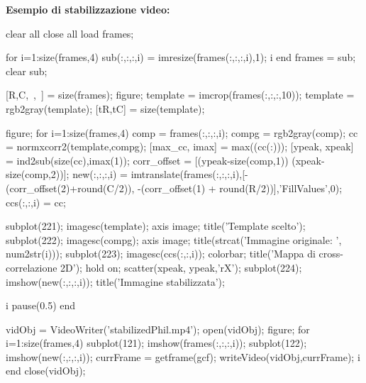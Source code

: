 \documentclass[a4paper, 10pt]{report}
\begin{document}
\noindent \textbf{Esempio di stabilizzazione video:}

\begin{code}
clear all
close all
load frames; %


for i=1:size(frames,4)        %
    sub(:,:,:,i) = imresize(frames(:,:,:,i),1);  
    i
end
frames = sub;
clear sub;

[R,C,~,~] = size(frames);  %
figure; template = imcrop(frames(:,:,:,10));
template = rgb2gray(template);  %
[tR,tC] = size(template);  %


figure;
for i=1:size(frames,4)
    comp  = frames(:,:,:,i);
    compg = rgb2gray(comp);
    cc = normxcorr2(template,compg);
    [max_cc, imax] = max((cc(:)));
    [ypeak, xpeak] = ind2sub(size(cc),imax(1)); %
    corr_offset = [(ypeak-size(comp,1)) (xpeak-size(comp,2))]; %
    new(:,:,:,i) = imtranslate(frames(:,:,:,i),[-(corr_offset(2)+round(C/2)), -(corr_offset(1) + round(R/2))],'FillValues',0); %
    ccs(:,:,i) = cc;
    
    subplot(221); imagesc(template); axis image; title('Template scelto');
    subplot(222); imagesc(compg); axis image;  title(strcat('Immagine originale: ', num2str(i)));
    subplot(223); imagesc(ccs(:,:,i)); colorbar; title('Mappa di cross-correlazione 2D');
    hold on;      scatter(xpeak, ypeak,'rX');
    subplot(224); imshow(new(:,:,:,i)); title('Immagine stabilizzata');
   
    i
    pause(0.5)
end

vidObj = VideoWriter('stabilizedPhil.mp4');
open(vidObj);
figure;
for i=1:size(frames,4)
    subplot(121); imshow(frames(:,:,:,i));
    subplot(122); imshow(new(:,:,:,i));
    currFrame = getframe(gcf);
    writeVideo(vidObj,currFrame);
    i
end 
   close(vidObj);
\end{code}
\end{document}
